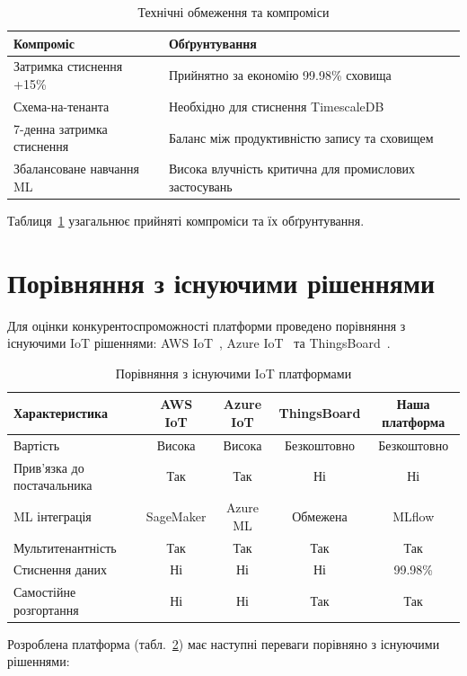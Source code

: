 \begin{table}[h]
\caption{Технічні обмеження та компроміси}
\label{tab:tradeoffs}
\begin{tabular}{@{}ll@{}}
\toprule
Компроміс & Обґрунтування \\
\midrule
Затримка стиснення +15\% & Прийнятно за економію 99.98\% сховища \\
Схема-на-тенанта & Необхідно для стиснення TimescaleDB \\
7-денна затримка стиснення & Баланс між продуктивністю запису та сховищем \\
Збалансоване навчання ML & Висока влучність критична для промислових застосувань \\
\bottomrule
\end{tabular}
\end{table}

Таблиця~\ref{tab:tradeoffs} узагальнює прийняті компроміси та їх обґрунтування.

\section{Порівняння з існуючими рішеннями}

Для оцінки конкурентоспроможності платформи проведено порівняння з існуючими IoT рішеннями: AWS IoT~\cite{aws_iot}, Azure IoT~\cite{azure_iot} та ThingsBoard~\cite{thingsboard}.

\begin{table}[h]
\caption{Порівняння з існуючими IoT платформами}
\label{tab:platform_comparison}
\small
\begin{tabular}{@{}lcccc@{}}
\toprule
Характеристика & AWS IoT & Azure IoT & ThingsBoard & Наша платформа \\
\midrule
Вартість & Висока & Висока & Безкоштовно & Безкоштовно \\
Прив'язка до постачальника & Так & Так & Ні & Ні \\
ML інтеграція & SageMaker & Azure ML & Обмежена & MLflow \\
Мультитенантність & Так & Так & Так & Так \\
Стиснення даних & Ні & Ні & Ні & 99.98\% \\
Самостійне розгортання & Ні & Ні & Так & Так \\
\bottomrule
\end{tabular}
\end{table}

Розроблена платформа (табл.~\ref{tab:platform_comparison}) має наступні переваги порівняно з існуючими рішеннями:

